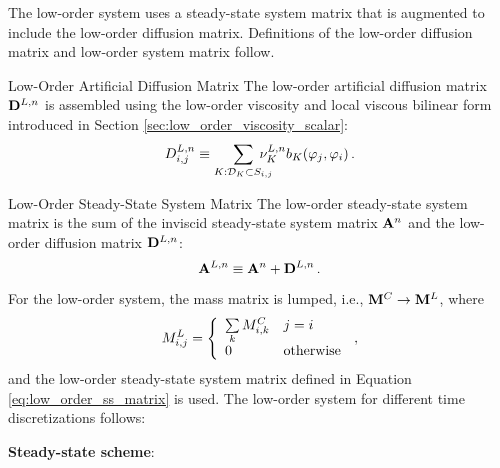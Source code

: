 The low-order system uses a steady-state system matrix that is augmented
to include the low-order diffusion matrix. Definitions of the low-order
diffusion matrix and low-order system matrix follow.
\begin{definition}{Low-Order Artificial Diffusion Matrix}
   The low-order artificial diffusion matrix $\loworderdiffusionmatrix[\timeindex]$
   is assembled using the low-order viscosity and local viscous bilinear
   form introduced in Section \ref{sec:low_order_viscosity_scalar}:
   \begin{equation}\label{eq:low_order_diffusion_matrix}
     \diffusionmatrixletter\ij^{L,\timeindex} \equiv
       \sumKSij\mkern-20mu\lowordercellviscosity[\timeindex]
       \localviscbilinearform{\cell}{j}{i} \eqp
   \end{equation}
\end{definition}
\begin{definition}{Low-Order Steady-State System Matrix}
   The low-order steady-state system matrix is the sum of the inviscid 
   steady-state system matrix $\ssmatrix[\timeindex]$ and the low-order diffusion
   matrix $\loworderdiffusionmatrix[\timeindex]$:
   \begin{equation}\label{eq:low_order_ss_matrix}
      \loworderssmatrix[\timeindex] \equiv
        \ssmatrix[\timeindex] + \loworderdiffusionmatrix[\timeindex] \eqp
   \end{equation}
\end{definition}
For the low-order system, the mass matrix is lumped, i.e.,
$\mathbf{M}^C\rightarrow\mathbf{M}^L$, where
\begin{equation}
  M^L_{i,j} = \left\{\begin{array}{l l}
    \sum\limits_k M^C_{i,k} & j = i\\
    0                                       & \mbox{otherwise}
    \end{array}\right.
    \,,
\end{equation}
and the low-order
steady-state system matrix defined in Equation \eqref{eq:low_order_ss_matrix}
is used. The low-order system for different time discretizations follows:
\begin{center}{\textbf{Steady-state scheme}:}\end{center}
